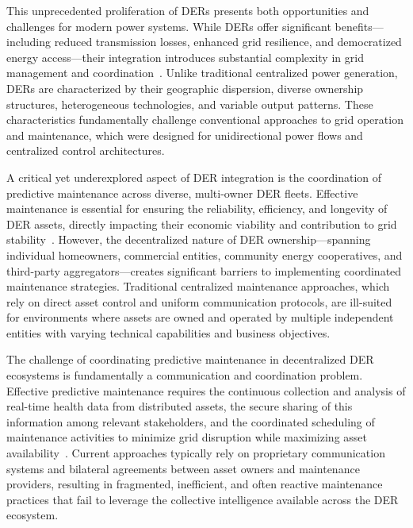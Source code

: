 \documentclass[12pt,a4paper]{article}
\begin{document}
This unprecedented proliferation of DERs presents both opportunities and challenges for modern power systems. While DERs offer significant benefits---including reduced transmission losses, enhanced grid resilience, and democratized energy access---their integration introduces substantial complexity in grid management and coordination~\cite{eid2016,parag2016}. Unlike traditional centralized power generation, DERs are characterized by their geographic dispersion, diverse ownership structures, heterogeneous technologies, and variable output patterns. These characteristics fundamentally challenge conventional approaches to grid operation and maintenance, which were designed for unidirectional power flows and centralized control architectures.

A critical yet underexplored aspect of DER integration is the coordination of predictive maintenance across diverse, multi-owner DER fleets. Effective maintenance is essential for ensuring the reliability, efficiency, and longevity of DER assets, directly impacting their economic viability and contribution to grid stability~\cite{jafari2020}. However, the decentralized nature of DER ownership---spanning individual homeowners, commercial entities, community energy cooperatives, and third-party aggregators---creates significant barriers to implementing coordinated maintenance strategies. Traditional centralized maintenance approaches, which rely on direct asset control and uniform communication protocols, are ill-suited for environments where assets are owned and operated by multiple independent entities with varying technical capabilities and business objectives.

The challenge of coordinating predictive maintenance in decentralized DER ecosystems is fundamentally a communication and coordination problem. Effective predictive maintenance requires the continuous collection and analysis of real-time health data from distributed assets, the secure sharing of this information among relevant stakeholders, and the coordinated scheduling of maintenance activities to minimize grid disruption while maximizing asset availability~\cite{zhang2019}. Current approaches typically rely on proprietary communication systems and bilateral agreements between asset owners and maintenance providers, resulting in fragmented, inefficient, and often reactive maintenance practices that fail to leverage the collective intelligence available across the DER ecosystem.
\end{document}
